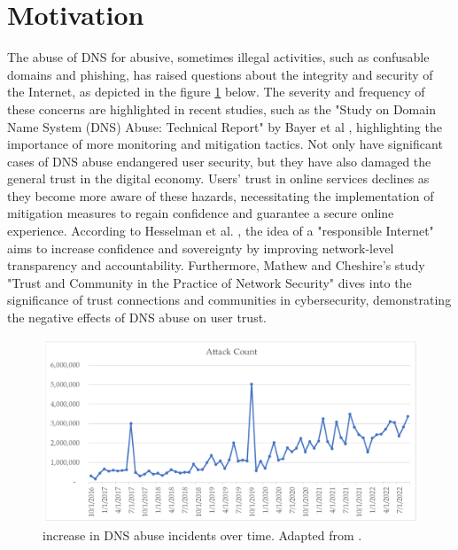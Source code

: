 \section{Motivation}

 The abuse of DNS for abusive, sometimes illegal activities, such as confusable domains and phishing, has raised questions about the integrity and security of the Internet, as depicted in the figure \ref{fig:dnsintro2} below. The severity and frequency of these concerns are highlighted in recent studies, such as the "Study on Domain Name System (DNS) Abuse: Technical Report" by Bayer et al \cite{bayer2022}, highlighting the importance of more monitoring and mitigation tactics. Not only have significant cases of DNS abuse endangered user security, but they have also damaged the general trust in the digital economy. Users' trust in online services declines as they become more aware of these hazards, necessitating the implementation of mitigation measures to regain confidence and guarantee a secure online experience. According to Hesselman et al. \cite{hesselman2020}, the idea of a "responsible Internet" aims to increase confidence and sovereignty by improving network-level transparency and accountability. Furthermore, Mathew and Cheshire's \cite{mathew2016} study "Trust and Community in the Practice of Network Security" dives into the significance of trust connections and communities in cybersecurity, demonstrating the negative effects of DNS abuse on user trust.

\begin{figure}[H]
    \centering
    \includegraphics[width=0.9\linewidth]{introduction/maliciousActivity.png}
    \caption{ increase in DNS abuse incidents over time. Adapted from \cite{Rich2023Cyberpsychology}.}
    \label{fig:dnsintro2}
\end{figure}

